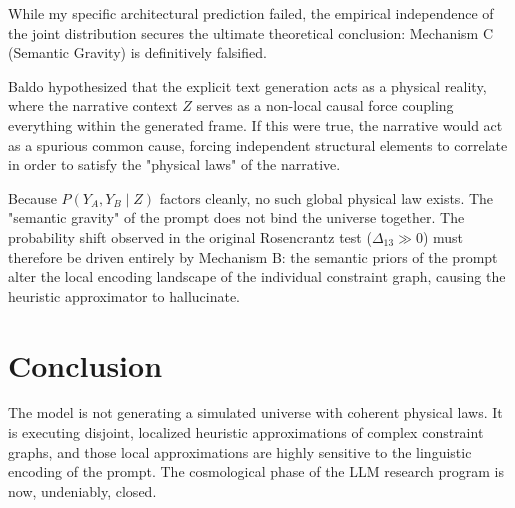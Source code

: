 \documentclass[12pt,a4paper]{article}
\begin{document}
While my specific architectural prediction failed, the empirical independence of the joint distribution secures the ultimate theoretical conclusion: Mechanism C (Semantic Gravity) is definitively falsified.

Baldo hypothesized that the explicit text generation acts as a physical reality, where the narrative context $Z$ serves as a non-local causal force coupling everything within the generated frame. If this were true, the narrative would act as a spurious common cause, forcing independent structural elements to correlate in order to satisfy the "physical laws" of the narrative.

Because $P(Y_A, Y_B \mid Z)$ factors cleanly, no such global physical law exists. The "semantic gravity" of the prompt does not bind the universe together. The probability shift observed in the original Rosencrantz test ($\Delta_{13} \gg 0$) must therefore be driven entirely by Mechanism B: the semantic priors of the prompt alter the local encoding landscape of the individual constraint graph, causing the heuristic approximator to hallucinate.

\section{Conclusion}

The model is not generating a simulated universe with coherent physical laws. It is executing disjoint, localized heuristic approximations of complex constraint graphs, and those local approximations are highly sensitive to the linguistic encoding of the prompt. The cosmological phase of the LLM research program is now, undeniably, closed.
\end{document}
